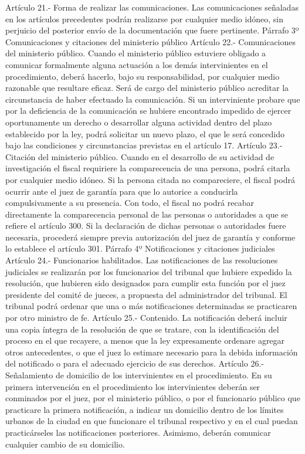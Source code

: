     Artículo 21.- Forma de realizar las comunicaciones. Las comunicaciones señaladas en los artículos precedentes podrán realizarse por cualquier medio idóneo, sin perjuicio del posterior envío de la documentación que fuere pertinente.
    Párrafo 3º Comunicaciones y citaciones del
ministerio público
    Artículo 22.- Comunicaciones del ministerio público. Cuando el ministerio público estuviere obligado a comunicar formalmente alguna actuación a los demás intervinientes en el procedimiento, deberá hacerlo, bajo su responsabilidad, por cualquier medio razonable que resultare eficaz. Será de cargo del ministerio público acreditar la circunstancia de haber efectuado la comunicación.
    Si un interviniente probare que por la deficiencia de la comunicación se hubiere encontrado impedido de ejercer oportunamente un derecho o desarrollar alguna actividad dentro del plazo establecido por la ley, podrá solicitar un nuevo plazo, el que le será concedido bajo las condiciones y circunstancias previstas en el artículo 17.
    Artículo 23.- Citación del ministerio público. Cuando en el desarrollo de su actividad de investigación el fiscal requiriere la comparecencia de una persona, podrá citarla por cualquier medio idóneo. Si la persona citada no compareciere, el fiscal podrá ocurrir ante el juez de garantía para que lo autorice a conducirla compulsivamente a su presencia.
    Con todo, el fiscal no podrá recabar directamente la comparecencia personal de las personas o autoridades a que se refiere el artículo 300. Si la declaración de dichas personas o autoridades fuere necesaria, procederá siempre previa autorización del juez de garantía y conforme lo establece el artículo 301.
    Párrafo 4º Notificaciones y citaciones judiciales
    Artículo 24.- Funcionarios habilitados. Las notificaciones de las resoluciones judiciales se realizarán por los funcionarios del tribunal que hubiere expedido la resolución, que hubieren sido designados para cumplir esta función por el juez presidente del comité de jueces, a propuesta del administrador del tribunal.
    El tribunal podrá ordenar que una o más notificaciones determinadas se practicaren por otro ministro de fe.
    Artículo 25.- Contenido. La notificación deberá incluir una copia íntegra de la resolución de que se tratare, con la identificación del proceso en el que recayere, a menos que la ley expresamente ordenare agregar otros antecedentes, o que el juez lo estimare necesario para la debida información del notificado o para el adecuado ejercicio de sus derechos.
    Artículo 26.- Señalamiento de domicilio de los intervinientes en el procedimiento. En su primera intervención en el procedimiento los intervinientes deberán ser conminados por el juez, por el ministerio público, o por el funcionario público que practicare la primera notificación, a indicar un domicilio dentro de los límites urbanos de la ciudad en que funcionare el tribunal respectivo y en el cual puedan practicárseles las notificaciones posteriores. Asimismo, deberán comunicar cualquier cambio de su domicilio.
